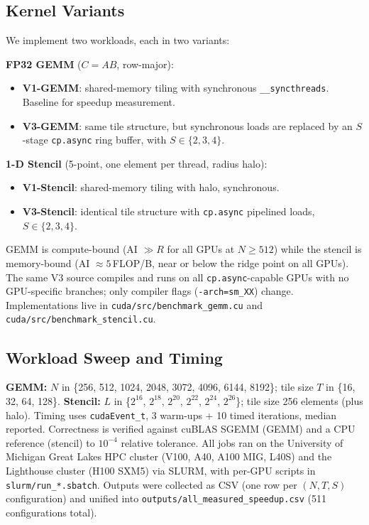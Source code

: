 \documentclass[10pt,twocolumn]{article}
\newcommand{\cpasync}{\texttt{cp.async}}
\begin{document}
\subsection{Kernel Variants}

We implement two workloads, each in two variants:

\textbf{FP32 GEMM} ($C = AB$, row-major):
\begin{itemize}
\item \textbf{V1-GEMM}: shared-memory tiling with synchronous
  \texttt{\_\_syncthreads}.  Baseline for speedup measurement.
\item \textbf{V3-GEMM}: same tile structure, but synchronous loads
  are replaced by an $S$-stage \cpasync{} ring buffer, with
  $S \in \{2, 3, 4\}$.
\end{itemize}

\textbf{1-D Stencil} (5-point, one element per thread, radius
halo):
\begin{itemize}
\item \textbf{V1-Stencil}: shared-memory tiling with halo,
  synchronous.
\item \textbf{V3-Stencil}: identical tile structure with
  \cpasync{} pipelined loads, $S \in \{2, 3, 4\}$.
\end{itemize}

GEMM is compute-bound (AI $\gg R$ for all GPUs at $N \geq 512$)
while the stencil is memory-bound (AI $\approx 5$\,FLOP/B, near or
below the ridge point on all GPUs).  The same V3 source compiles
and runs on all \cpasync{}-capable GPUs with no GPU-specific
branches; only compiler flags (\texttt{-arch=sm\_XX}) change.
Implementations live in
\texttt{cuda/src/benchmark\_gemm.cu} and
\texttt{cuda/src/benchmark\_stencil.cu}.

\subsection{Workload Sweep and Timing}
\label{sec:sweep}

\textbf{GEMM:} $N$ in \{256, 512, 1024, 2048, 3072, 4096, 6144,
8192\}; tile size $T$ in \{16, 32, 64, 128\}.
\textbf{Stencil:} $L$ in \{$2^{16}$, $2^{18}$, $2^{20}$, $2^{22}$,
$2^{24}$, $2^{26}$\}; tile size 256 elements (plus halo).
Timing uses \texttt{cudaEvent\_t}, 3 warm-ups + 10 timed
iterations, median reported.  Correctness is verified against
cuBLAS SGEMM (GEMM) and a CPU reference (stencil) to
$10^{-4}$ relative tolerance.  All jobs ran on the University of
Michigan Great Lakes HPC cluster (V100, A40, A100 MIG, L40S) and
the Lighthouse cluster (H100 SXM5) via SLURM, with per-GPU scripts
in \texttt{slurm/run\_*.sbatch}.  Outputs were collected as CSV
(one row per $(N, T, S)$ configuration) and unified into
\texttt{outputs/all\_measured\_\allowbreak speedup.csv}
(511 configurations total).
\end{document}
